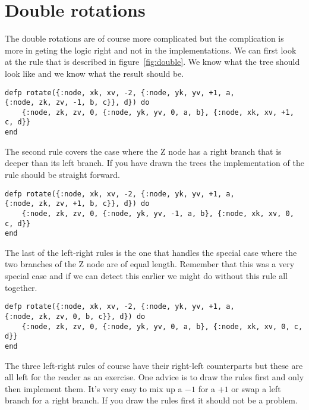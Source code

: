 \documentclass[a4paper,11pt]{article}
\begin{document}
\section{Double rotations}

The double rotations are of course more complicated but the
complication is more in geting the logic right and not in the
implementations. We can first look at the rule that is described in
figure~\ref{fig:double}. We know what the tree should look like and we
know what the result should be.

\begin{verbatim}
defp rotate({:node, xk, xv, -2, {:node, yk, yv, +1, a, 
{:node, zk, zv, -1, b, c}}, d}) do
    {:node, zk, zv, 0, {:node, yk, yv, 0, a, b}, {:node, xk, xv, +1, c, d}}
end
\end{verbatim}

The second rule covers the case where the Z node has a right branch
that is deeper than its left branch. If you have drawn the trees the
implementation of the rule should be straight forward.

\begin{verbatim}
defp rotate({:node, xk, xv, -2, {:node, yk, yv, +1, a, 
{:node, zk, zv, +1, b, c}}, d}) do
    {:node, zk, zv, 0, {:node, yk, yv, -1, a, b}, {:node, xk, xv, 0, c, d}}
end
\end{verbatim}

The last of the left-right rules is the one that handles the special
case where the two branches of the Z node are of equal
length. Remember that this was a very special case and if we can
detect this earlier we might do without this rule all together.

\begin{verbatim}
defp rotate({:node, xk, xv, -2, {:node, yk, yv, +1, a, 
{:node, zk, zv, 0, b, c}}, d}) do
    {:node, zk, zv, 0, {:node, yk, yv, 0, a, b}, {:node, xk, xv, 0, c, d}}
end
\end{verbatim}

The three left-right rules of course have their right-left counterparts
but these are all left for the reader as an exercise. One advice is to
draw the rules first and only then implement them. It's very easy to
mix up a $-1$ for a $+1$ or swap a left branch for a right branch. If
you draw the rules first it should not be a problem.


\end{document}
